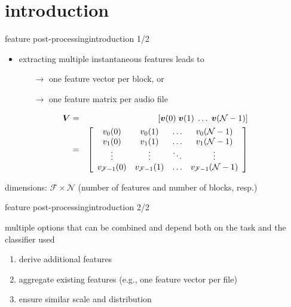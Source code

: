     \section[intro]{introduction}
        \begin{frame}{feature post-processing}{introduction 1/2}
            \begin{itemize}
                \item   extracting multiple instantaneous features leads to 
                    \begin{itemize}
                        \item[$\rightarrow$]   one feature vector per block, or
                        \item[$\rightarrow$]   one feature matrix per audio file
                    \end{itemize}
            \end{itemize}
            \bigskip
			\begin{eqnarray*}
				\mat{V} &=& \left[\vec{v}(0)\; 			\vec{v}(1)\; 				\ldots\;	\vec{v}(\mathcal{N}-1)\right]  \nonumber\\ 
				&=& 				 
						\left[ 
				  			\begin{array}{cccc} 
							v_0(0)					&	v_0(1) 					&	\ldots	&	v_0(\mathcal{N}-1)\\
							v_1(0)					&	v_1(1) 					&	\ldots	&	v_1(\mathcal{N}-1)\\
							\vdots					&	\vdots 					&	\ddots		&	\vdots	\\
							v_{\mathcal{F}-1}(0)	&	v_{\mathcal{F}-1}(1) 	&	\ldots	&	v_{\mathcal{F}-1}(\mathcal{N}-1)\\
							\end{array}  
						\right] 
			\end{eqnarray*}
            
            \bigskip
            \begin{footnotesize}
                dimensions:  $\mathcal{F}\times \mathcal{N}$ (number of features and number of blocks, resp.)
            \end{footnotesize}
        \end{frame}
        
        \begin{frame}{feature post-processing}{introduction 2/2}
            
            multiple options that can be combined and depend both on the task and the classifier used
            \begin{enumerate}   
                \item   derive additional features
                \item   aggregate existing features (e.g., one feature vector per file)
                \item   ensure similar scale and distribution
            \end{enumerate}
        \end{frame}

